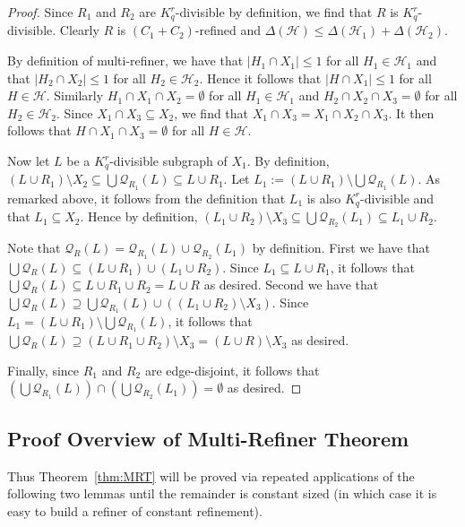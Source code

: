 \documentclass[11pt]{article}
\newcounter{i}
\theoremstyle{plain}
\theoremstyle{plain} %
\theoremstyle{definition}
\begin{document}
\begin{proof}
Since $R_1$ and $R_2$ are $K_q^r$-divisible by definition, we find that $R$ is $K_q^r$-divisible. Clearly $R$ is $(C_1+C_2)$-refined and $\Delta(\mathcal{H}) \le \Delta(\mathcal{H}_1) + \Delta(\mathcal{H}_2)$.     

By definition of multi-refiner, we have that $|H_1\cap X_1|\le 1$ for all $H_1\in \mathcal{H}_1$ and that $|H_2\cap X_2|\le 1$ for all $H_2\in \mathcal{H}_2$. Hence it follows that $|H\cap X_1|\le 1$ for all $H\in \mathcal{H}$. Similarly $H_1\cap X_1\cap X_2 =\emptyset$ for all $H_1\in \mathcal{H}_1$ and $H_2\cap X_2\cap X_3=\emptyset$ for all $H_2\in \mathcal{H}_2$. Since $X_1\cap X_3\subseteq X_2$, we find that $X_1\cap X_3=X_1\cap X_2\cap X_3$. It then follows that $H\cap X_1\cap X_3=\emptyset$ for all $H\in \mathcal{H}$.

Now let $L$ be a $K_q^r$-divisible subgraph of $X_1$. By definition, $(L\cup R_1)\setminus X_2 \subseteq \bigcup \mathcal{Q}_{R_1}(L)\subseteq L\cup R_1$. Let $L_1:= (L\cup R_1)\setminus \bigcup \mathcal{Q}_{R_1}(L)$. As remarked above, it follows from the definition that $L_1$ is also $K_q^r$-divisible and that $L_1\subseteq X_2$. Hence by definition, $(L_1\cup R_2)\setminus X_3 \subseteq \bigcup \mathcal{Q}_{R_2}(L_1)\subseteq L_1\cup R_2$. 

Note that $\mathcal{Q}_R(L) = \mathcal{Q}_{R_1}(L)\cup \mathcal{Q}_{R_2}(L_1)$ by definition. First we have that $\bigcup \mathcal{Q}_R(L) \subseteq (L\cup R_1) \cup (L_1\cup R_2)$. Since $L_1\subseteq L\cup R_1$, it follows that $\bigcup \mathcal{Q}_R(L) \subseteq L\cup R_1 \cup R_2 = L\cup R$ as desired. Second we have that $\bigcup \mathcal{Q}_R(L) \supseteq  \bigcup \mathcal{Q}_{R_1}(L) \cup ((L_1\cup R_2)\setminus X_3)$. Since $L_1= (L\cup R_1)\setminus \bigcup \mathcal{Q}_{R_1}(L)$, it follows that $\bigcup \mathcal{Q}_R(L) \supseteq (L\cup R_1 \cup R_2)\setminus X_3 = (L\cup R)\setminus X_3$ as desired.

Finally, since $R_1$ and $R_2$ are edge-disjoint, it follows that $(\bigcup \mathcal{Q}_{R_1}(L))\cap (\bigcup \mathcal{Q}_{R_2}(L_1)) = \emptyset$ as desired. 
\end{proof}

\subsection{Proof Overview of Multi-Refiner Theorem}

Thus Theorem~\ref{thm:MRT} will be proved via repeated applications of the following two lemmas until the remainder is constant sized (in which case it is easy to build a refiner of constant refinement).
\end{document}
